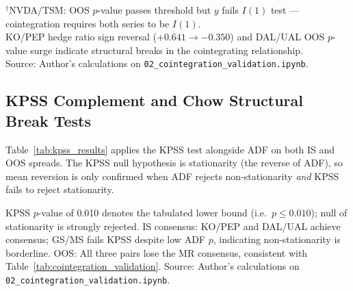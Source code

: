 \documentclass[a4paper]{report}
\begin{document}
\begin{table}[htbp]
\par\smallskip
\begin{minipage}{\linewidth}
\small
$^{\dagger}$NVDA/TSM: OOS $p$-value passes threshold but $y$ fails $I(1)$ test --- cointegration requires both series to be $I(1)$.\\
KO/PEP hedge ratio sign reversal ($+0.641 \to -0.350$) and DAL/UAL OOS $p$-value surge indicate structural breaks in the cointegrating relationship.\\
Source: Author's calculations on \texttt{02\_cointegration\_validation.ipynb}.
\end{minipage}
\end{table}

\FloatBarrier

\subsection{KPSS Complement and Chow Structural Break Tests}

Table~\ref{tab:kpss_results} applies the KPSS test alongside ADF on both IS and OOS spreads.
The KPSS null hypothesis is stationarity (the reverse of ADF), so mean reversion is only
confirmed when ADF rejects non-stationarity \emph{and} KPSS fails to reject stationarity.

\begin{table}[htbp]
\centering
\caption{ADF and KPSS stationarity tests on IS and OOS spreads (using IS hedge ratios).
Mean-reversion (MR) consensus requires ADF $p < 0.05$ and KPSS $p > 0.05$ simultaneously.}
\label{tab:kpss_results}
\par\smallskip
\begin{minipage}{\linewidth}
\small
KPSS $p$-value of 0.010 denotes the tabulated lower bound (i.e.\ $p \leq 0.010$); null of stationarity is strongly rejected.
IS consensus: KO/PEP and DAL/UAL achieve consensus; GS/MS fails KPSS despite low ADF $p$, indicating non-stationarity is borderline.
OOS: All three pairs lose the MR consensus, consistent with Table~\ref{tab:cointegration_validation}.
Source: Author's calculations on \texttt{02\_cointegration\_validation.ipynb}.
\end{minipage}
\end{table}
\end{document}
